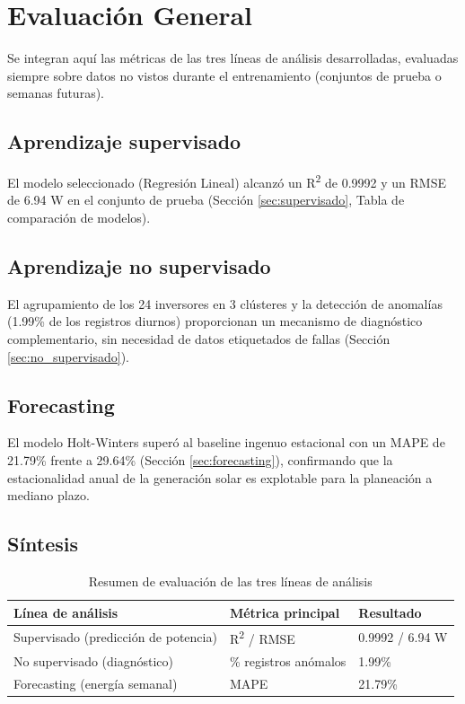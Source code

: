 \section{Evaluación General}
\label{sec:evaluacion}

Se integran aquí las métricas de las tres líneas de análisis desarrolladas, evaluadas siempre sobre datos no vistos durante el entrenamiento (conjuntos de prueba o semanas futuras).

\subsection*{Aprendizaje supervisado}

El modelo seleccionado (Regresión Lineal) alcanzó un R\textsuperscript{2} de 0.9992 y un RMSE de 6.94 W en el conjunto de prueba (Sección \ref{sec:supervisado}, Tabla de comparación de modelos).

\subsection*{Aprendizaje no supervisado}

El agrupamiento de los 24 inversores en 3 clústeres y la detección de anomalías (1.99\% de los registros diurnos) proporcionan un mecanismo de diagnóstico complementario, sin necesidad de datos etiquetados de fallas (Sección \ref{sec:no_supervisado}).

\subsection*{Forecasting}

El modelo Holt-Winters superó al baseline ingenuo estacional con un MAPE de 21.79\% frente a 29.64\% (Sección \ref{sec:forecasting}), confirmando que la estacionalidad anual de la generación solar es explotable para la planeación a mediano plazo.

\subsection*{Síntesis}

\begin{table}[H]
\centering
\begin{tabular}{lll}
\toprule
\textbf{Línea de análisis} & \textbf{Métrica principal} & \textbf{Resultado} \\
\midrule
Supervisado (predicción de potencia) & R\textsuperscript{2} / RMSE & 0.9992 / 6.94 W \\
No supervisado (diagnóstico) & \% registros anómalos & 1.99\% \\
Forecasting (energía semanal) & MAPE & 21.79\% \\
\bottomrule
\end{tabular}
\caption{Resumen de evaluación de las tres líneas de análisis}
\end{table}
